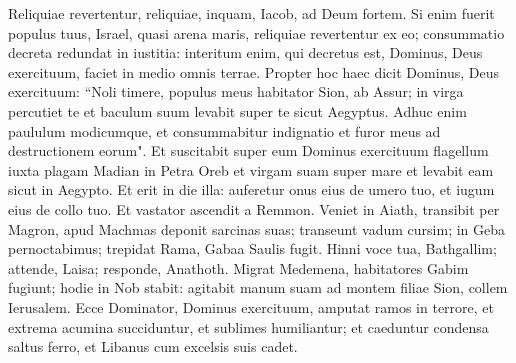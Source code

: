 \begin{biblechapter}
\verse Reliquiae revertentur, reliquiae, inquam, Iacob, ad Deum fortem. 
\verse Si enim fuerit populus tuus, Israel, quasi arena maris, reliquiae revertentur ex eo; consummatio decreta redundat in iustitia: 
\verse interitum enim, qui decretus est, Dominus, Deus exercituum, faciet in medio omnis terrae. 
\verse Propter hoc haec dicit Dominus, Deus exercituum: “Noli timere, populus meus habitator Sion, ab Assur; in virga percutiet te et baculum suum levabit super te sicut Aegyptus. 
\verse Adhuc enim paululum modicumque, et consummabitur indignatio et furor meus ad destructionem eorum". 
\verse Et suscitabit super eum Dominus exercituum flagellum iuxta plagam Madian in Petra Oreb et virgam suam super mare et levabit eam sicut in Aegypto. 
\verse Et erit in die illa: auferetur onus eius de umero tuo, et iugum eius de collo tuo. Et vastator ascendit a Remmon. 
\verse Veniet in Aiath, transibit per Magron, apud Machmas deponit sarcinas suas; 
\verse transeunt vadum cursim; in Geba pernoctabimus; trepidat Rama, Gabaa Saulis fugit. 
\verse Hinni voce tua, Bathgallim; attende, Laisa; responde, Anathoth. 
\verse Migrat Medemena, habitatores Gabim fugiunt; 
\verse hodie in Nob stabit: agitabit manum suam ad montem filiae Sion, collem Ierusalem. 
\verse Ecce Dominator, Dominus exercituum, amputat ramos in terrore, et extrema acumina succiduntur, et sublimes humiliantur; 
\verse et caeduntur condensa saltus ferro, et Libanus cum excelsis suis cadet. 
\end{biblechapter}

